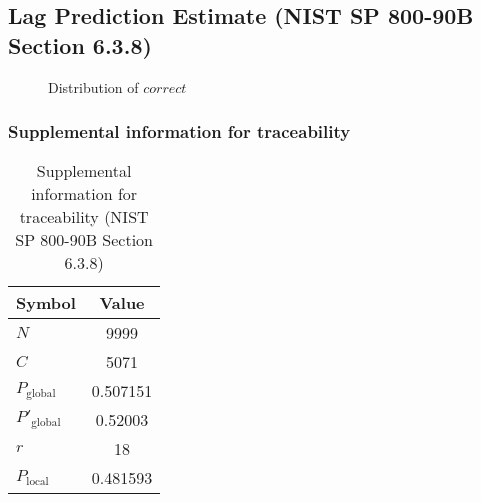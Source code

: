 \documentclass[a3paper,xelatex,english]{bxjsarticle}
\begin{document}
\subsection{Lag Prediction Estimate (NIST SP 800-90B Section 6.3.8)}
\begin{figure}[htbp]
\centering

\caption{Distribution of $correct$}
\end{figure}
\subsubsection{Supplemental information for traceability}
\renewcommand{\arraystretch}{1.8}
\begin{table}[h]
\caption{Supplemental information for traceability (NIST SP 800-90B Section 6.3.8)}
\begin{center}
\begin{tabular}{|l|c|}
\hline 
\rowcolor{anotherlightblue} %
Symbol				& Value \\ \hline 
$N$				& 9999\\ \hline 
$C$				& 5071\\ \hline 
$P_{\textrm{global}}$				& 0.507151\\ \hline 
$P'_{\textrm{global}}$			&  0.52003\\ \hline 
$r$				& 18\\ \hline 
$P_{\textrm{local}}$ 			& 0.481593\\ \hline
\end{tabular}
\end{center}
\end{table}
\renewcommand{\arraystretch}{1.4}
\clearpage
\end{document}
